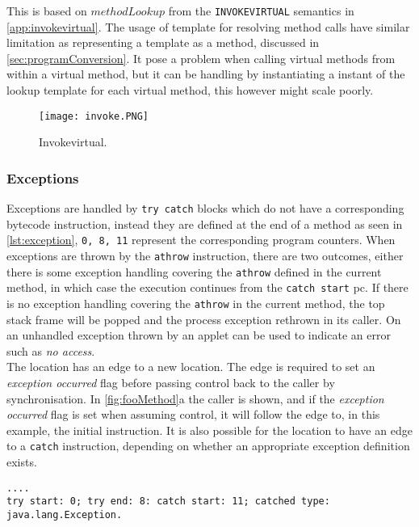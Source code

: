 \noindent This is based on $methodLookup$ from the \texttt{INVOKEVIRTUAL} semantics in \cref{app:invokevirtual}. The usage of template for resolving method calls have similar limitation as representing a template as a method, discussed in \cref{sec:programConversion}. It pose a problem when calling virtual methods from within a virtual method, but it can be handling by instantiating a instant of the lookup template for each virtual method, this however might scale poorly.

 
\begin{figure}[H]
\centering
\texttt{[image: invoke.PNG]}
\caption{Invokevirtual.}
\label{fig:invokevirtual}
\end{figure}

\subsubsection{Exceptions}
\label{sec:exceptions}
Exceptions are handled by \texttt{try catch} blocks which do not have a corresponding bytecode instruction, instead they are defined at the end of a method as seen in \cref{lst:exception}, \texttt{0, 8, 11} represent the corresponding program counters.
When exceptions are thrown by the \texttt{athrow} instruction, there are two outcomes, either there is some exception handling covering the \texttt{athrow} defined in the current method, in which case the execution continues from the \texttt{catch start} pc. 
If there is no exception handling covering the \texttt{athrow} in the current method, the top stack frame will be popped and the process exception rethrown in its caller. On \jc an unhandled exception thrown by an applet can be used to indicate an error such as \textit{no access}.\\

\noindent The  location has an edge to a new location. The edge is required to set an \textit{exception occurred} flag before passing control back to the caller by synchronisation. In \cref{fig:fooMethod}a the caller is shown, and if the \textit{exception occurred} flag is set when assuming control, it will follow the edge to, in this example, the initial instruction. It is also possible for the  location to have an edge to a \texttt{catch} instruction, depending on whether an appropriate exception definition exists.


\begin{lstlisting}[caption={Exception definition as it apears in the bytecode. },numbers=none,label={lst:exception}]
....
try start: 0; try end: 8: catch start: 11; catched type: java.lang.Exception.
\end{lstlisting}





